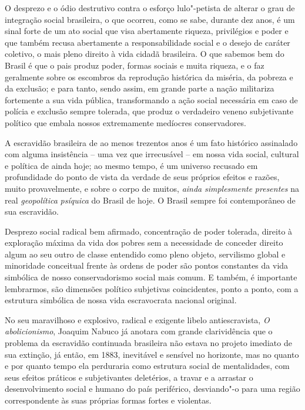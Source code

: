O desprezo e o ódio destrutivo contra o esforço lulo"-petista de alterar
o grau de integração social brasileira, o que ocorreu, como se sabe,
durante dez anos, é um sinal forte de um ato social que visa abertamente
riqueza, privilégios e poder e que também recusa abertamente a
responsabilidade social e o desejo de caráter coletivo, o mais pleno
direito à vida cidadã brasileira. O que sabemos bem do Brasil é que o
pais produz poder, formas sociais e muita riqueza, e o faz geralmente
sobre os escombros da reprodução histórica da miséria, da pobreza e da
exclusão; e para tanto, sendo assim, em grande parte a nação militariza
fortemente a sua vida pública, transformando a ação social necessária em
caso de polícia e exclusão sempre tolerada, que produz o verdadeiro
veneno subjetivante político que embala nossos extremamente medíocres
conservadores.

A escravidão brasileira de ao menos trezentos anos é um fato histórico
assinalado com alguma insistência -- uma vez que irrecusável -- em nossa
vida social, cultural e política de ainda hoje; ao mesmo tempo, é um
universo recusado em profundidade do ponto de vista da verdade de seus
próprios efeitos e razões, muito provavelmente, e sobre o corpo de
muitos, \emph{ainda} \emph{simplesmente} \emph{presentes} na real
\emph{geopolítica} \emph{psíquica} do Brasil de hoje. O Brasil sempre
foi contemporâneo de sua escravidão.

Desprezo social radical bem afirmado, concentração de poder tolerada,
direito à exploração máxima da vida dos pobres sem a necessidade de
conceder direito algum ao seu outro de classe entendido como pleno
objeto, servilismo global e minoridade conceitual frente às ordens de
poder são pontos constantes da vida simbólica de nosso conservadorismo
social mais comum. E também, é importante lembrarmos, são dimensões
político subjetivas coincidentes, ponto a ponto, com a estrutura
simbólica de nossa vida escravocrata nacional original.

No seu maravilhoso e explosivo, radical e exigente libelo
antiescravista, \emph{O abolicionismo}, Joaquim Nabuco já anotara com
grande clarividência que o problema da escravidão continuada brasileira
não estava no projeto imediato de sua extinção, já então, em 1883,
inevitável e sensível no horizonte, mas no quanto e por quanto tempo ela
perduraria como estrutura social de mentalidades, com seus efeitos
práticos e subjetivantes deletérios, a travar e a arrastar o
desenvolvimento social e humano do país periférico, desviando"-o para uma
região correspondente às suas próprias formas fortes e violentas.

